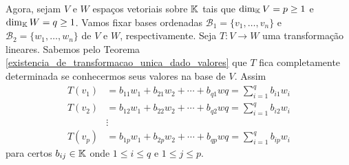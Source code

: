 Agora, sejam $V$ e $W$ espaços vetoriais sobre $\mathbb{K}$ tais que $\dim_{\mathbb{K}}V = p \ge 1$ e $\dim_{\mathbb{K}} W = q \ge 1$. Vamos fixar bases ordenadas $\mathcal{B}_1 = \{v_1,\dots,v_n\}$ e $\mathcal{B}_2 = \{w_1,\dots,w_n\}$ de $V$ e $W$, respectivamente. Seja $T : V \to W$ uma transformação lineares. Sabemos pelo Teorema \ref{existencia_de_transformacao_unica_dado_valores} que $T$ fica completamente determinada se conhecermos seus valores na base de $V$. Assim
\begin{align*}
	T(v_1) &= b_{11}w_1 + b_{21}w_2 + \cdots + b_{q1}wq = \sum_{i=1}^qb_{i1}w_i\\
	T(v_2) &= b_{12}w_1 + b_{22}w_2 + \cdots + b_{q2}wq = \sum_{i=1}^qb_{i2}w_i\\
	&\vdots\\
	T(v_p) &= b_{1p}w_1 + b_{2p}w_2 + \cdots + b_{qp}wq = \sum_{i=1}^qb_{ip}w_i
\end{align*}
para certos $b_{ij} \in \mathbb{K}$ onde $1 \le i \le q$ e $1 \le j \le p$.


